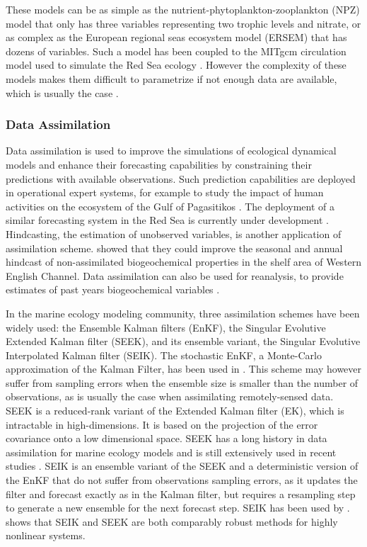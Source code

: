 These models can be as simple as the nutrient-phytoplankton-zooplankton (NPZ)
model that only has three variables representing two trophic levels and
nitrate, or as complex as the European regional seas ecosystem model (ERSEM)
that has dozens of variables. Such a model has been coupled to the MITgcm
circulation model used to simulate the Red Sea ecology
\citep{Triantafyllou2014}. However the complexity of these models makes them
difficult to parametrize if not enough data are available, which is usually the
case \citep{Anderson2005}.

\subsubsection{Data Assimilation}

Data assimilation is used to improve the simulations of ecological dynamical
models and enhance their forecasting capabilities by constraining their
predictions with available observations. Such prediction capabilities are
deployed in operational expert systems, for example to study the impact of
human activities on the ecosystem of the Gulf of Pagasitikos
\citep{Korres2012}. The deployment of a similar forecasting system in the Red
Sea is currently under development \citep{Triantafyllou2014}. Hindcasting, the
estimation of unobserved variables, is another application of assimilation
scheme. \citet{Ciavatta2011}  showed that they could improve the seasonal and
annual hindcast of non-assimilated biogeochemical properties in the shelf area
of Western English Channel. Data assimilation can also be used for reanalysis,
to provide estimates of past years biogeochemical variables
\citep{Fontana2013}. 

In the marine ecology modeling community, three assimilation schemes have been
widely used: the Ensemble Kalman filters (EnKF), the Singular Evolutive
Extended Kalman filter (SEEK), and its ensemble variant, the Singular Evolutive
Interpolated Kalman filter (SEIK). The stochastic EnKF, a Monte-Carlo
approximation of the Kalman Filter, has been used in \citet{Ciavatta2011,
Ciavatta2014}. This scheme may however suffer from sampling errors when the
ensemble size is smaller than the number of observations, as is usually the
case when assimilating remotely-sensed data. SEEK is a reduced-rank variant of
the Extended Kalman filter (EK), which is intractable in high-dimensions. It is
based  on the projection of the error covariance onto a low dimensional space.
SEEK has a long history in data assimilation for marine ecology models and is
still extensively used in recent studies \citep{Fontana2013, Korres2012,
Butenschon2012}.  SEIK is an ensemble variant of the SEEK  and a deterministic
version of the EnKF that do not suffer from observations sampling errors, as it
updates the filter and forecast exactly as in the Kalman filter, but requires a
resampling step to generate a new ensemble for the next forecast step. SEIK has
been used by \citep{Triantafyllou2012, Korres2012}.  \citet{Korres2012} shows
that SEIK and SEEK are both comparably robust methods for highly nonlinear
systems.

